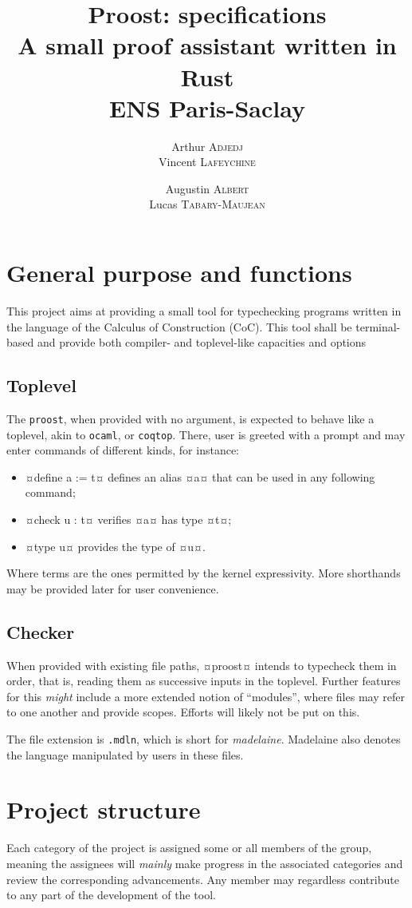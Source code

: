 \documentclass[twocolumn]{article}
\author{
  Arthur \textsc{Adjedj}\\
  Vincent \textsc{Lafeychine} \and
  Augustin \textsc{Albert} \\
  Lucas \textsc{Tabary-Maujean}
}
\title{\textbf{Proost: specifications}\\
  \large A small proof assistant written in Rust
  \\[1\baselineskip]\normalsize ENS Paris-Saclay
}
\begin{document}
\thispagestyle{fancy}
\maketitle

\section{General purpose and functions}
This project aims at providing a small tool for typechecking programs written in
the language of the Calculus of Construction (CoC). This tool shall be
terminal-based and provide both compiler- and toplevel-like capacities and
options

\subsection{Toplevel}
The \texttt{proost}, when provided with no argument, is expected to behave like
a toplevel, akin to \texttt{ocaml}, or \texttt{coqtop}. There, user is greeted with a
prompt and may enter commands of different kinds, for instance:
\begin{itemize}
  \item ¤define a := t¤ defines an alias ¤a¤ that can be used in any following
    command;
  \item ¤check u : t¤ verifies ¤a¤ has type ¤t¤;
  \item ¤type u¤ provides the type of ¤u¤.
\end{itemize}

Where terms are the ones permitted by the kernel expressivity.
More shorthands may be provided later for user convenience.

\subsection{Checker}
When provided with existing file paths, ¤proost¤ intends to typecheck them in
order, that is, reading them as successive inputs in the toplevel. Further
features for this \emph{might} include a more extended notion of ``modules'', where files
may refer to one another and provide scopes. Efforts will likely not be put on
this.

The file extension is \texttt{.mdln}, which is short for \emph{madelaine}.
Madelaine also denotes the language manipulated by users in these files.

\section{Project structure}
Each category of the project is assigned some or all members of the group,
meaning the assignees will \emph{mainly} make progress in the associated categories
and review the corresponding advancements. Any member may regardless contribute to any part
of the development of the tool.
\end{document}
